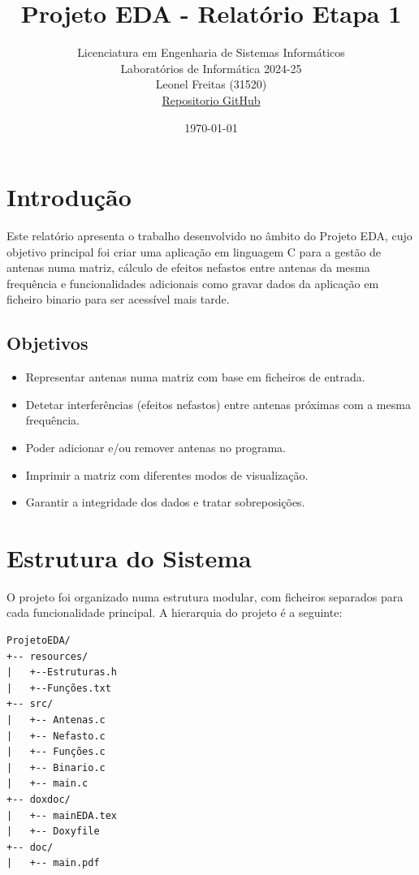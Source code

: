 \documentclass[a4paper,12pt]{report}
\title{\textbf{Projeto EDA - Relatório Etapa 1}}
\author{
    Licenciatura em Engenharia de Sistemas Informáticos \\ 
    Laboratórios de Informática 2024-25 \\ Leonel Freitas (31520)\\
    \href{https://github.com/Leonel-Freitas64/ProjetoEDA}{Repositorio GitHub}}
\date{\today}
\begin{document}
\maketitle
\tableofcontents
\newpage

\chapter{Introdução}
Este relatório apresenta o trabalho desenvolvido no âmbito do Projeto EDA, cujo objetivo principal foi criar uma aplicação em linguagem C para a gestão de antenas numa matriz, cálculo de efeitos nefastos entre antenas da mesma frequência e funcionalidades adicionais como gravar dados da aplicação em ficheiro binario para ser acessível mais tarde.

\section{Objetivos}
\begin{itemize}
    \item Representar antenas numa matriz com base em ficheiros de entrada.
    \item Detetar interferências (efeitos nefastos) entre antenas próximas com a mesma frequência.
    \item Poder adicionar e/ou remover antenas no programa.
    \item Imprimir a matriz com diferentes modos de visualização.
    \item Garantir a integridade dos dados e tratar sobreposições.
\end{itemize}

\chapter{Estrutura do Sistema}
O projeto foi organizado numa estrutura modular, com ficheiros separados para cada funcionalidade principal. A hierarquia do projeto é a seguinte:

\begin{verbatim}
ProjetoEDA/
+-- resources/
|   +--Estruturas.h
|   +--Funções.txt
+-- src/
|   +-- Antenas.c
|   +-- Nefasto.c
|   +-- Funções.c
|   +-- Binario.c
|   +-- main.c
+-- doxdoc/
|   +-- mainEDA.tex
|   +-- Doxyfile
+-- doc/
|   +-- main.pdf
\end{verbatim}

\newpage
\end{document}

